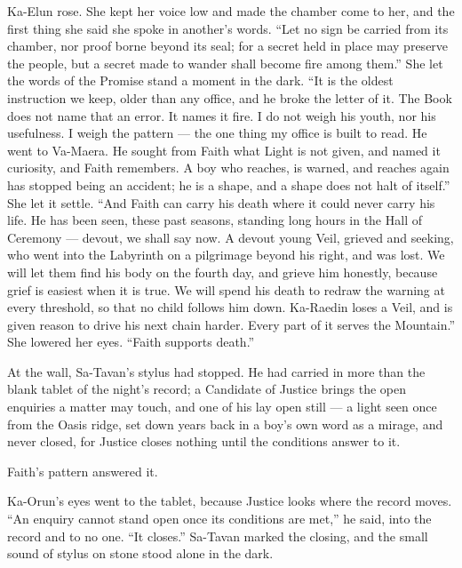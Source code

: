 Ka-Elun rose. She kept her voice low and made the chamber come to her, and the first thing she said she spoke in another's words. ``Let no sign be carried from its chamber, nor proof borne beyond its seal; for a secret held in place may preserve the people, but a secret made to wander shall become fire among them.'' She let the words of the Promise stand a moment in the dark. ``It is the oldest instruction we keep, older than any office, and he broke the letter of it. The Book does not name that an error. It names it fire. I do not weigh his youth, nor his usefulness. I weigh the pattern --- the one thing my office is built to read. He went to Va-Maera. He sought from Faith what Light is not given, and named it curiosity, and Faith remembers. A boy who reaches, is warned, and reaches again has stopped being an accident; he is a shape, and a shape does not halt of itself.'' She let it settle. ``And Faith can carry his death where it could never carry his life. He has been seen, these past seasons, standing long hours in the Hall of Ceremony --- devout, we shall say now. A devout young Veil, grieved and seeking, who went into the Labyrinth on a pilgrimage beyond his right, and was lost. We will let them find his body on the fourth day, and grieve him honestly, because grief is easiest when it is true. We will spend his death to redraw the warning at every threshold, so that no child follows him down. Ka-Raedin loses a Veil, and is given reason to drive his next chain harder. Every part of it serves the Mountain.'' She lowered her eyes. ``Faith supports death.''\par


At the wall, Sa-Tavan's stylus had stopped. He had carried in more than the blank tablet of the night's record; a Candidate of Justice brings the open enquiries a matter may touch, and one of his lay open still --- a light seen once from the Oasis ridge, set down years back in a boy's own word as a mirage, and never closed, for Justice closes nothing until the conditions answer to it.\par

Faith's pattern answered it.\par

Ka-Orun's eyes went to the tablet, because Justice looks where the record moves. ``An enquiry cannot stand open once its conditions are met,'' he said, into the record and to no one. ``It closes.'' Sa-Tavan marked the closing, and the small sound of stylus on stone stood alone in the dark.\par

